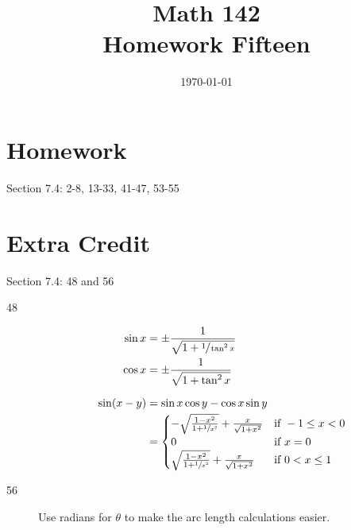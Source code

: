 \documentclass{exam}
\author{}
\date{\today}
\title{Math 142 \\ Homework Fifteen}
\begin{document}
  \maketitle

  \section{Homework}
  Section 7.4: 2-8, 13-33, 41-47, 53-55

  \section{Extra Credit}
  Section 7.4: 48 and 56

  \ifprintanswers
    \begin{description}
      \item[48]
        \begin{align*}
          \sin x &= \pm \frac{1}{\sqrt{1 + \sfrac{1}{\tan^2 x}}} \\
          \cos x &= \pm \frac{1}{\sqrt{1 + \tan^2 x}} \\
          \\
          \sin(x - y) &= \sin x \cos y - \cos x \sin y \\
                      &= \begin{cases}
                            - \sqrt{ \frac{1 - x^2}{1 + \sfrac{1}{x^2}}} + \frac{x}{\sqrt{1 + x^2}} & \mbox{if } -1 \leq x < 0 \\
                            0                                                                       & \mbox{if } x = 0 \\
                            \sqrt{ \frac{1 - x^2}{1 + \sfrac{1}{x^2}}} + \frac{x}{\sqrt{1 + x^2}}   & \mbox{if } 0 < x \leq 1 \\
                          \end{cases}
        \end{align*}

      \item[56]
        Use radians for $\theta$ to make the arc length calculations easier.

\end{description}
\end{document}
